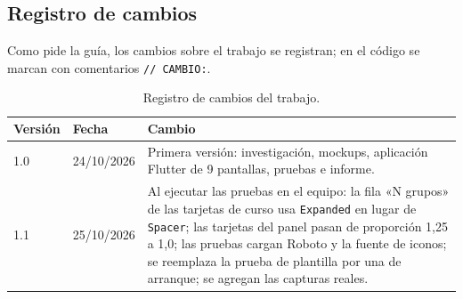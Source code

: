 \subsection{Registro de cambios}
Como pide la guía, los cambios sobre el trabajo se registran; en el código se marcan con comentarios \texttt{// CAMBIO:}.

\begin{table}[H]
	\centering\footnotesize
	\begin{tabularx}{\textwidth}{|p{1.4cm}|p{2.4cm}|X|}
		\hline
		\rowcolor{tablebackground}\color{white}\textbf{Versión} & \color{white}\textbf{Fecha} & \color{white}\textbf{Cambio}\\
		\hline
		1.0 & 24/10/2026 & Primera versión: investigación, mockups, aplicación Flutter de 9 pantallas, pruebas e informe. \\\hline
		1.1 & 25/10/2026 & Al ejecutar las pruebas en el equipo: la fila «N grupos» de las tarjetas de curso usa \texttt{Expanded} en lugar de \texttt{Spacer}; las tarjetas del panel pasan de proporción 1,25 a 1,0; las pruebas cargan Roboto y la fuente de iconos; se reemplaza la prueba de plantilla por una de arranque; se agregan las capturas reales. \\\hline
	\end{tabularx}
	\caption{Registro de cambios del trabajo.}
	\label{tab:cambios}
\end{table}
